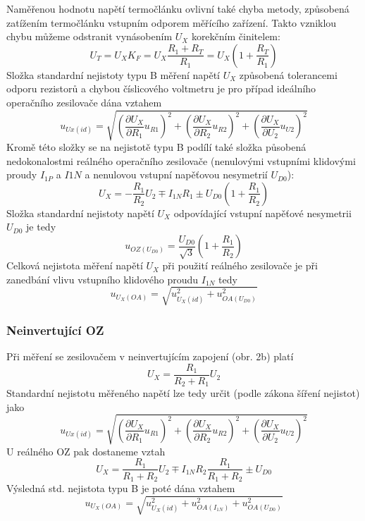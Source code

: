 \documentclass{article}
\begin{document}
Naměřenou hodnotu napětí termočlánku ovlivní také chyba metody, způsobená zatížením termočlánku vstupním odporem měřícího zařízení. Takto vzniklou chybu můžeme odstranit vynásobením $U_X$ korekčním činitelem:
\begin{equation}
    U_T = U_X K_F = U_X \frac{R_1+R_T}{R_1} = U_X (1+\frac{R_T}{R_1})
\end{equation}
Složka standardní nejistoty typu B měření napětí $U_X$ způsobená tolerancemi odporu rezistorů a chybou číslicového voltmetru je pro případ ideálního operačního zesilovače dána vztahem
\begin{equation}
    u_{Ux(id)}=\sqrt{(\frac{\partial U_X}{\partial R_1}u_{R1})^2 + (\frac{\partial U_X}{\partial R_2}u_{R2})^2 + (\frac{\partial U_X}{\partial U_2}u_{U2})^2}
\end{equation}
Kromě této složky se na nejistotě typu B podílí také složka působená nedokonalostmi reálného operačního zesilovače (nenulovými vstupními klidovými proudy $I_{1P}$ a $I{1N}$ a nenulovou vstupní napěťovou nesymetrií $U_{D0}$):
\begin{equation}
    U_X=-\frac{R_1}{R_2}U_2 \mp I_{1N}R_1\pm U_{D0}(1+\frac{R_1}{R_2})
\end{equation}
Složka standardní nejistoty napětí $U_{X}$ odpovídající vstupní napěťové nesymetrii $U_{D0}$ je
tedy
\begin{equation}
    u_{OZ(U_{D0})} = \frac{U_{D0}}{\sqrt{3}}(1+\frac{R_1}{R_2})
\end{equation}
Celková nejistota měření napětí $U_{X}$ při použití reálného zesilovače je při zanedbání vlivu
vstupního klidového proudu $I_{1N}$ tedy
\begin{equation}
    u_{U_X(OA)}=\sqrt{u_{U_X(id)}^2+u_{OA(U_{D0})}^2}
\end{equation}

\subsubsection{Neinvertující OZ}
Při měření se zesilovačem v neinvertujícím zapojení (obr. 2b) platí
\begin{equation}
    U_X=\frac{R_1}{R_2+R_1}U_2
\end{equation}
Standardní nejistotu měřeného napětí lze tedy určit (podle zákona šíření nejistot) jako
\begin{equation}
    u_{Ux(id)}=\sqrt{(\frac{\partial U_X}{\partial R_1}u_{R1})^2 + (\frac{\partial U_X}{\partial R_2}u_{R2})^2 + (\frac{\partial U_X}{\partial U_2}u_{U2})^2}
\end{equation}
U reálného OZ pak dostaneme vztah
\begin{equation}
    U_X=\frac{R_1}{R_1+R_2}U_2 \mp I_{1N}R_2\frac{R_1}{R_1+R_2}\pm U_{D0}
\end{equation}
Výsledná std. nejistota typu B je poté dána vztahem
\begin{equation}
    u_{U_X(OA)}=\sqrt{u_{U_X(id)}^2+u_{OA(I_{1N})}^2+u_{OA(U_{D0})}^2}
\end{equation}
\end{document}
